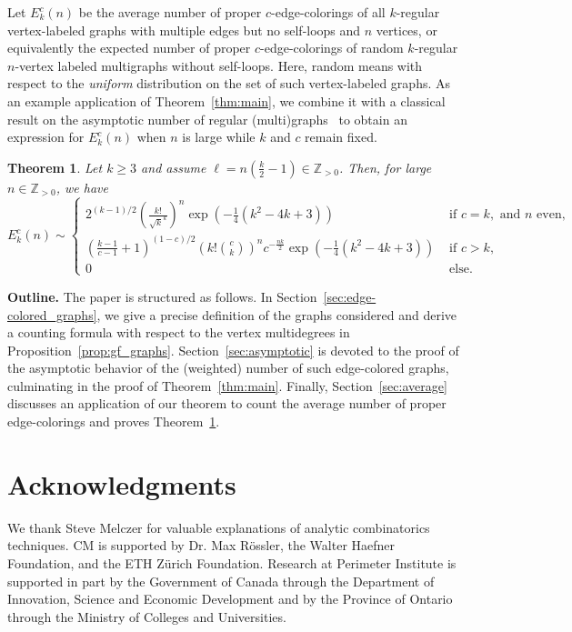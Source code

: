 \documentclass[a4paper,oneside]{amsart}
\newtheorem{theorem}{Theorem}
\numberwithin{theorem}{section}
\theoremstyle{remark}
\newcommand{\Z}{\mathbb{Z}}
\begin{document}
Let 
${E}^{c}_k(n)$ be the average number of proper $c$-edge-colorings of all $k$-regular vertex-labeled graphs with multiple edges but no self-loops and $n$ vertices, or equivalently the expected number of proper $c$-edge-colorings of random $k$-regular $n$-vertex labeled multigraphs without self-loops. Here, random means with respect to the \emph{uniform} distribution on the set of such vertex-labeled graphs.
As an example  application of Theorem~\ref{thm:main}, we combine it with a classical result on the asymptotic number of regular (multi)graphs~\cite{bender1978asymptotic} to obtain an expression for ${E}^{c}_k(n)$ when $n$ is large while $k$ and $c$ remain fixed.

\begin{theorem}
  \label{thm:multigraphs}
  Let $k\geq 3$ and assume $\ell = n\left(\tfrac{k}{2}-1\right) \in \Z_{>0}$. Then, for large $n\in \Z_{>0}$, we have
  \[
    {E}^{c}_k(n) \sim \left\{ \begin{array}{ll}
      2^{(k-1)/2} \left(\frac{k!}{\sqrt{k}^k}\right)^{n} \exp\left( -\frac{1}{4}(k^2 -4k +3) \right)
& \text{ if } c=k, \text{ and } n \text{ even},\\
        \left( \frac{k-1}{c-1} + 1 \right)^{(1-c)/2} \left( k! \binom{c}{k} \right)^n c^{-\frac{nk}{2}}  
\exp\left( -\frac{1}{4}(k^2 -4k +3) \right)
& \text{ if } c > k,\\
      0 & \text{ else.}
    \end{array}\right.
    \]
\end{theorem}


\medskip
\noindent\textbf{Outline.}
The paper is structured as follows. In Section~\ref{sec:edge-colored_graphs}, we give a precise definition of the graphs considered and derive a counting formula with respect to the vertex multidegrees in Proposition~\ref{prop:gf_graphs}. Section~\ref{sec:asymptotic} is devoted to the proof of the asymptotic behavior of the (weighted) number of such edge-colored graphs, culminating in the proof of Theorem~\ref{thm:main}. Finally, Section~\ref{sec:average} discusses an application of our theorem to count the average
number of proper edge-colorings and proves Theorem~\ref{thm:multigraphs}.

\section*{Acknowledgments}
We thank Steve Melczer for valuable explanations of analytic combinatorics techniques.
CM is supported by Dr. Max R\"ossler, the Walter Haefner Foundation, and the ETH Z\"urich Foundation.
Research at Perimeter Institute is supported in part by the Government of Canada through the Department of Innovation, Science and Economic Development and by the Province of Ontario through the Ministry of Colleges and Universities. 
\end{document}
